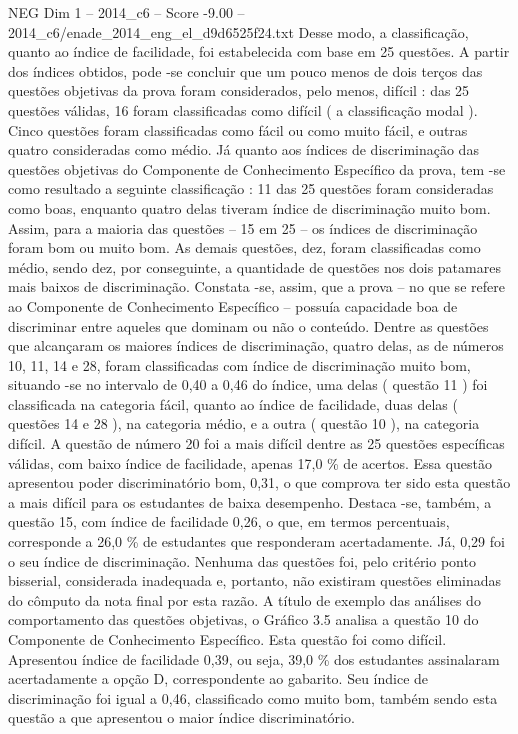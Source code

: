 \begin{textsample}{NEG Dim 1 – 2014\_c6 – Score -9.00 – 2014\_c6/enade\_2014\_eng\_el\_d9d6525f24.txt}
Desse modo, a classificação, quanto ao índice de facilidade, foi estabelecida com base em 25 questões.
A partir dos índices obtidos, pode -se concluir que um pouco menos de dois terços das questões objetivas da prova foram considerados, pelo menos, difícil : das 25 questões válidas, 16 foram classificadas como difícil ( a classificação modal ).
Cinco questões foram classificadas como fácil ou como muito fácil, e outras quatro consideradas como médio.
Já quanto aos índices de discriminação das questões objetivas do Componente de Conhecimento Específico da prova, tem -se como resultado a seguinte classificação : 11 das 25 questões foram consideradas como boas, enquanto quatro delas tiveram índice de discriminação muito bom.
Assim, para a maioria das questões – 15 em 25 – os índices de discriminação foram bom ou muito bom.
As demais questões, dez, foram classificadas como médio, sendo dez, por conseguinte, a quantidade de questões nos dois patamares mais baixos de discriminação.
Constata -se, assim, que a prova – no que se refere ao Componente de Conhecimento Específico – possuía capacidade boa de discriminar entre aqueles que dominam ou não o conteúdo.
Dentre as questões que alcançaram os maiores índices de discriminação, quatro delas, as de números 10, 11, 14 e 28, foram classificadas com índice de discriminação muito bom, situando -se no intervalo de 0,40 a 0,46 do índice, uma delas ( questão 11 ) foi classificada na categoria fácil, quanto ao índice de facilidade, duas delas ( questões 14 e 28 ), na categoria médio, e a outra ( questão 10 ), na categoria difícil.
A questão de número 20 foi a mais difícil dentre as 25 questões específicas válidas, com baixo índice de facilidade, apenas 17,0 \% de acertos.
Essa questão apresentou poder discriminatório bom, 0,31, o que comprova ter sido esta questão a mais difícil para os estudantes de baixa desempenho.
Destaca -se, também, a questão 15, com índice de facilidade 0,26, o que, em termos percentuais, corresponde a 26,0 \% de estudantes que responderam acertadamente.
Já, 0,29 foi o seu índice de discriminação.
Nenhuma das questões foi, pelo critério ponto bisserial, considerada inadequada e, portanto, não existiram questões eliminadas do cômputo da nota final por esta razão.
A título de exemplo das análises do comportamento das questões objetivas, o Gráfico 3.5 analisa a questão 10 do Componente de Conhecimento Específico.
Esta questão foi como difícil.
Apresentou índice de facilidade 0,39, ou seja, 39,0 \% dos estudantes assinalaram acertadamente a opção D, correspondente ao gabarito.
Seu índice de discriminação foi igual a 0,46, classificado como muito bom, também sendo esta questão a que apresentou o maior índice discriminatório.

\end{textsample}
